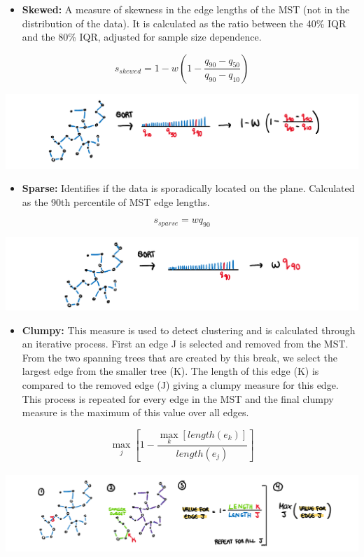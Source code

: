 \begin{itemize}
\tightlist
\item
  \textbf{Skewed:} A measure of skewness in the edge lengths of the MST
  (not in the distribution of the data). It is calculated as the ratio
  between the 40\% IQR and the 80\% IQR, adjusted for sample size
  dependence.
\end{itemize}

\[s_{skewed} = 1-w(1-\frac{q_{90}-{q_{50}}}{q_{90}-q_{10}})\]

\includegraphics{figures/drawskewed.png}

\begin{itemize}
\tightlist
\item
  \textbf{Sparse:} Identifies if the data is sporadically located on the
  plane. Calculated as the 90th percentile of MST edge lengths.
\end{itemize}

\[s_{sparse}= wq_{90}\]

\includegraphics{figures/drawsparse.png}

\begin{itemize}
\tightlist
\item
  \textbf{Clumpy:} This measure is used to detect clustering and is
  calculated through an iterative process. First an edge J is selected
  and removed from the MST. From the two spanning trees that are created
  by this break, we select the largest edge from the smaller tree (K).
  The length of this edge (K) is compared to the removed edge (J) giving
  a clumpy measure for this edge. This process is repeated for every
  edge in the MST and the final clumpy measure is the maximum of this
  value over all edges.
\end{itemize}

\[\max_{j}[1-\frac{\max_{k}[length(e_k)]}{length(e_j)}]\]\\
\includegraphics{figures/drawclumpy.png}

